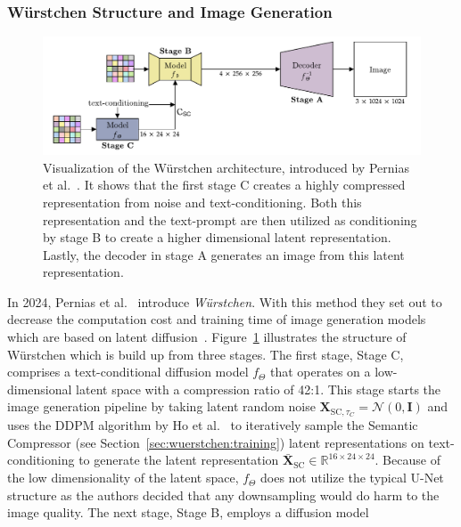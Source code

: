 \subsubsection{W\"urstchen Structure and Image Generation}
\begin{figure}[t]
    \includegraphics[width=\textwidth]{assets/wuerstchen_arch.pdf}
    \caption{Visualization of the W\"urstchen architecture, introduced by
        Pernias et al.~\cite{pernias2024wrstchen}. It shows that the first stage C
        creates a highly compressed representation from noise and text-conditioning.
        Both this representation and the text-prompt are then utilized as conditioning by stage B
        to create a higher dimensional latent representation. Lastly, the decoder
        in stage A generates an image from this latent representation.}
    \label{fig:wuerstchen:arch}
\end{figure}
In 2024, Pernias et al.~\cite{pernias2024wrstchen} introduce \emph{W\"urstchen}.
With this method they set out to decrease the computation cost and training
time of image generation models which are based on latent diffusion~\cite{rombach2022stablediffusion}.
Figure~\ref{fig:wuerstchen:arch} illustrates the structure of W\"urstchen which
is build up from three stages. The first stage, Stage C, comprises a
text-conditional diffusion model $f_\Theta$ that operates on a low-dimensional
latent space with a compression ratio of 42:1. This stage starts the image
generation pipeline by taking latent random noise
$\boldsymbol{X}_{\text{SC}, \tau_C} = \mathcal{N}(0, \boldsymbol{\text{I}})$ and
uses the DDPM algorithm by Ho et al.~\cite{ho2020denoisingdiffusionprobabilisticmodels} to iteratively
sample the Semantic Compressor (see Section~\ref{sec:wuerstchen:training})
latent representations on text-conditioning to generate the latent representation
$\bar{\boldsymbol{X}}_{\text{SC}}\in\mathbb{R}^{16\times24\times24}$. Because of
the low dimensionality of the latent space, $f_\Theta$ does not utilize the
typical U-Net structure as the authors decided that any downsampling would do
harm to the image quality. The next stage, Stage B, employs a diffusion model
